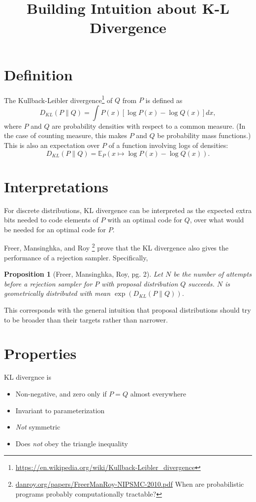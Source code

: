 \documentclass[12pt]{article}
\title{Building Intuition about K-L Divergence}
\newcommand{\E}{\mathbb{E}}
\newtheorem{proposition}{Proposition}
\begin{document}
\maketitle

\section{Definition}

The Kullback-Leibler
divergence\footnote{\url{https://en.wikipedia.org/wiki/Kullback-Leibler_divergence}}
of $Q$ from $P$ is defined as
\[ D_{KL}(P\|Q) = \int P(x) \left[ \log P(x) - \log Q(x) \right] dx , \]
where $P$ and $Q$ are probability densities with respect to a common
measure.  (In the case of counting measure, this makes $P$ and $Q$ be
probability mass functions.)  This is also an expectation over $P$
of a function involving logs of densities:
\[ D_{KL}(P\|Q) = \E_P (x \mapsto \log P(x) - \log Q(x)). \]

\section{Interpretations}

For discrete distributions, KL divergence can be interpreted as the
expected extra bits needed to code elements of $P$ with an optimal
code for $Q$, over what would be needed for an optimal code for $P$.

Freer, Mansinghka, and
Roy \footnote{\url{danroy.org/papers/FreerManRoy-NIPSMC-2010.pdf} When
  are probabilistic programs probably computationally tractable?}
prove that the KL divergence also gives the performance of a rejection
sampler.  Specifically,

\begin{proposition}[Freer, Mansinghka, Roy, pg. 2]
Let $N$ be the number of attempts before a rejection sampler for $P$
with proposal distribution $Q$ succeeds.  $N$ is geometrically distributed
with mean $\exp(D_{KL}(P\|Q))$.
\end{proposition}
This corresponds with the general intuition that proposal
distributions should try to be broader than their targets rather than
narrower.

\section{Properties}

KL divergnce is
\begin{itemize}
\item Non-negative, and zero only if $P = Q$ almost everywhere
\item Invariant to parameterization
\item \emph{Not} symmetric
\item Does \emph{not} obey the triangle inequality
\end{itemize}
\end{document}
